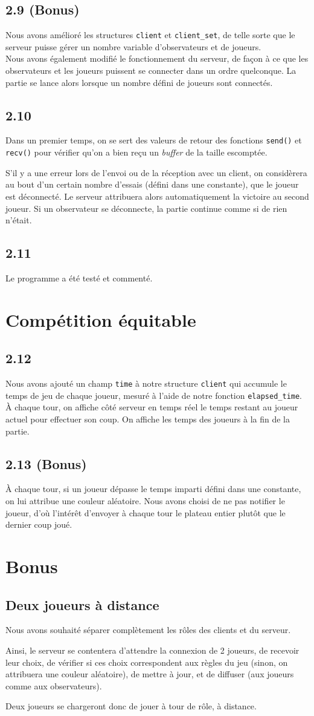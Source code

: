 \documentclass[12pt]{article}
\def\question#1{\subsection{#1}}
\def\sec#1{\section{#1}}
\begin{document}
\question{2.9 (Bonus)}
Nous avons amélioré les structures \texttt{client} et \texttt{client\_set}, de telle sorte que le serveur puisse gérer un nombre variable d'observateurs et de joueurs. \\
Nous avons également modifié le fonctionnement du serveur, de façon à ce que les observateurs et les joueurs puissent se connecter dans un ordre quelconque. La partie se lance alors lorsque un nombre défini de joueurs sont connectés.

\question{2.10}
Dans un premier temps, on se sert des valeurs de retour des fonctions \texttt{send()} et \texttt{recv()} pour vérifier qu'on a bien reçu un \textit{buffer} de la taille escomptée.

S'il y a une erreur lors de l'envoi ou de la réception avec un client, on considèrera au bout d'un certain nombre d'essais (défini dans une constante), que le joueur est déconnecté. Le serveur attribuera alors automatiquement la victoire au second joueur. Si un observateur se déconnecte, la partie continue comme si de rien n'était.
\question{2.11}
Le programme a été testé et commenté.


\sec{Compétition équitable}

\question{2.12}
Nous avons ajouté un champ \texttt{time} à notre structure \texttt{client} qui accumule le temps de jeu de chaque joueur, mesuré à l'aide de notre fonction \texttt{elapsed\_time}. \\
À chaque tour, on affiche côté serveur en temps réel le temps restant au joueur actuel pour effectuer son coup.
On affiche les temps des joueurs à la fin de la partie.

\question{2.13 (Bonus)}
À chaque tour, si un joueur dépasse le temps imparti défini dans une constante, on lui attribue une couleur aléatoire. Nous avons choisi de ne pas notifier le joueur, d'où l'intérêt d'envoyer à chaque tour le plateau entier plutôt que le dernier coup joué.

\sec{Bonus}
\question{Deux joueurs à distance}

Nous avons souhaité séparer complètement les rôles des clients et du serveur.

Ainsi, le serveur se contentera d'attendre la connexion de 2 joueurs, de recevoir leur choix, de vérifier si ces choix correspondent aux règles du jeu (sinon, on attribuera une couleur aléatoire), de mettre à jour, et de diffuser (aux joueurs comme aux observateurs).

Deux joueurs se chargeront donc de jouer à tour de rôle, à distance.
\end{document}
